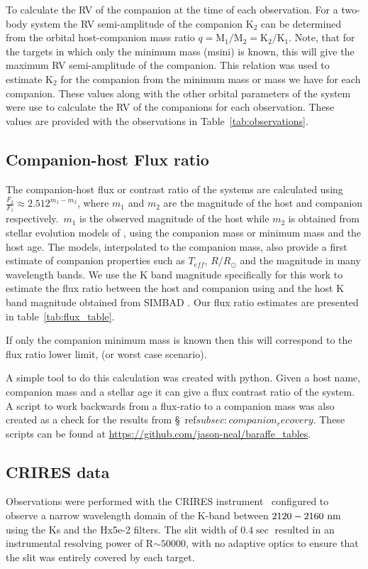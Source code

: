 To calculate the RV of the companion at the time of each observation. For a two-body system the RV semi-amplitude of the companion $\textrm{K}_{2}$ can be determined from the orbital host-companion mass ratio $q = \textrm{M}_{1}/\textrm{M}_{2} = \textrm{K}_{2}/\textrm{K}_{1}$.
Note, that for the targets in which only the minimum mass (msini) is known, this will give the maximum RV semi-amplitude of the companion.
This relation was used to estimate $\textrm{K}_2$ for the companion from the minimum mass or mass we have for each companion. These values along with the other orbital parameters of the system were use to calculate the RV of the companions for each observation. These values are provided with the observations in Table~\ref{tab:observations}.


\subsection{Companion-host Flux ratio}
The companion-host flux or contrast ratio of the systems are calculated using $ \frac{F_{2}}{F_{1}} \approx 2.512^{m_1-m_2} $, where $m_1$ and $m_2$ are the magnitude of the host and companion respectively.\ $m_1$ is the observed magnitude of the host while $m_2$ is obtained from stellar evolution models of \citet{baraffe_evolutionary_2003, baraffe_new_2015}, using the companion mass or minimum mass and the host age. The models, interpolated to the companion mass, also provide a first estimate of companion properties such as $T_{eff}$, $R/R_{\odot}$ and the magnitude in many wavelength bands.
We use the K band magnitude specifically for this work to estimate the flux ratio between the host and companion using and the host K band magnitude obtained from SIMBAD \citep{wenger_simbad_2000}. Our flux ratio estimates are presented in table~\ref{tab:flux_table}.

If only the companion minimum mass is known then this will correspond to the flux ratio lower limit, (or worst case scenario).


A simple tool to do this calculation was created with python. Given a host name, companion mass and a stellar age it can give a flux contrast ratio of the system. A script to work backwards from a flux-ratio to a companion mass was also created as a check for the results from \S~ref$ {subsec:companion_recovery}$. These scripts can be found at \url{https://github.com/jason-neal/baraffe_tables}.


\subsection{CRIRES data}
\label{subsec:CRIRES}
Observations were performed with the CRIRES instrument~\citep{kaeufl_crires_2004} configured to observe a narrow wavelength domain of the K-band between \(\rm2120-2160~nm \) using the Ks and the Hx5e-2 filters. The slit width of \(0.4\sec \) resulted in an instrumental resolving power of R\(\sim50000 \), with no adaptive optics to ensure that the slit was entirely covered by each target.

